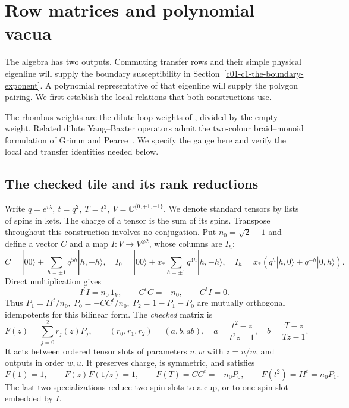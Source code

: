 \section{Row matrices and polynomial vacua}\label{c01-c1-the-row-matrices-and-two-fusions}

The algebra has two outputs. Commuting transfer rows and their simple
physical eigenline will supply the boundary susceptibility in
Section~\ref{c01-c1-the-boundary-exponent}. A polynomial representative
of that eigenline will supply the polygon pairing. We first establish
the local relations that both constructions use.

The rhombus weights are the dilute-loop weights of
\cite[Eq.~(1.2)]{ZhouBatchelor1997}, divided by the empty weight.
Related dilute Yang--Baxter operators admit the two-colour braid--monoid
formulation of Grimm and Pearce~\cite[Sections~4.2, 4.5--4.6]{GrimmPearce1993}.
We specify the gauge here and verify the local and transfer identities
needed below.

\subsection*{The checked tile and its rank reductions}

Write \(q=e^{i\lambda},\ t=q^2,\ T=t^3,\ V=\mathbb C^{\{0,+1,-1\}}\).
We denote standard tensors by lists of spins in kets. The charge of a
tensor is the sum of its spins. Transpose throughout this construction
involves no conjugation. Put \(n_0=\sqrt2-1\) and define a vector \(C\)
and a map \(I:V\to V^{\otimes2}\), whose columns are \(I_h\):
\[
 C=|00\rangle+\sum_{h=\pm1}q^{5h}|h,-h\rangle,\quad
 I_0=|00\rangle+x_*\sum_{h=\pm1}q^{4h}|h,-h\rangle,\quad
 I_h=x_*(q^h|h,0\rangle+q^{-h}|0,h\rangle).
\]
Direct multiplication gives
\[
 I^tI=n_0\,1_V,\qquad C^tC=-n_0,\qquad C^tI=0.
\]
Thus \(P_1=II^t/n_0,\ P_0=-CC^t/n_0,\ P_2=1-P_1-P_0\)
are mutually orthogonal idempotents for this bilinear form. The
\emph{checked} matrix is
\[
 F(z)=\sum_{j=0}^2 r_j(z)P_j,\qquad
 (r_0,r_1,r_2)=(a,b,ab),\quad
 a=\frac{t^2-z}{t^2z-1},\quad b=\frac{T-z}{Tz-1}.
\]
It acts between ordered tensor slots of parameters \(u,w\) with \(z=u/w\),
and outputs in order \(w,u\). It preserves charge, is symmetric, and satisfies
\[
 F(1)=1,\qquad F(z)F(1/z)=1,\qquad
 F(T)=CC^t=-n_0P_0,\qquad F(t^2)=II^t=n_0P_1.
\]
The last two specializations reduce two spin slots to a cup, or to one
spin slot embedded by \(I\).

